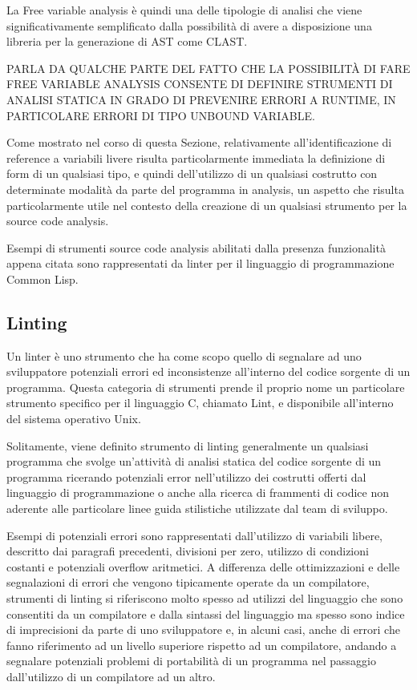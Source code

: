 La Free variable analysis è quindi una delle tipologie di analisi che viene
significativamente semplificato dalla possibilità di avere a disposizione una
libreria per la generazione di AST come CLAST.

PARLA DA QUALCHE PARTE DEL FATTO CHE LA POSSIBILITÀ DI FARE FREE VARIABLE
ANALYSIS CONSENTE DI DEFINIRE STRUMENTI DI ANALISI STATICA IN GRADO DI PREVENIRE
ERRORI A RUNTIME, IN PARTICOLARE ERRORI DI TIPO UNBOUND VARIABLE.

Come mostrato nel corso di questa Sezione, relativamente all'identificazione di
reference a variabili livere risulta particolarmente immediata la definizione di
form di un qualsiasi tipo, e quindi dell'utilizzo di un qualsiasi costrutto con
determinate modalità da parte del programma in analysis, un aspetto che risulta
particolarmente utile nel contesto della creazione di un qualsiasi strumento per
la source code analysis.

Esempi di strumenti source code analysis abilitati dalla presenza funzionalità
appena citata sono rappresentati da linter per il linguaggio di programmazione
Common Lisp.

\subsection{Linting}

Un linter è uno strumento che ha come scopo quello di segnalare ad uno
sviluppatore potenziali errori ed inconsistenze all'interno del codice sorgente
di un programma. Questa categoria di strumenti prende il proprio nome un
particolare strumento specifico per il linguaggio C, chiamato Lint, e
disponibile all'interno del sistema operativo Unix.

Solitamente, viene definito strumento di linting generalmente un qualsiasi
programma che svolge un'attività di analisi statica del codice sorgente di un
programma ricerando potenziali error nell'utilizzo dei costrutti offerti dal
linguaggio di programmazione o anche alla ricerca di frammenti di codice non
aderente alle particolare linee guida stilistiche utilizzate dal team di
sviluppo.

Esempi di potenziali errori sono rappresentati dall'utilizzo di variabili
libere, descritto dai paragrafi precedenti, divisioni per zero, utilizzo di
condizioni costanti e potenziali overflow aritmetici. A differenza delle
ottimizzazioni e delle segnalazioni di errori che vengono tipicamente operate da
un compilatore, strumenti di linting si riferiscono molto spesso ad utilizzi del
linguaggio che sono consentiti da un compilatore e dalla sintassi del linguaggio
ma spesso sono indice di imprecisioni da parte di uno sviluppatore e, in alcuni
casi, anche di errori che fanno riferimento ad un livello superiore rispetto ad
un compilatore, andando a segnalare potenziali problemi di portabilità di un
programma nel passaggio dall'utilizzo di un compilatore ad un altro.

